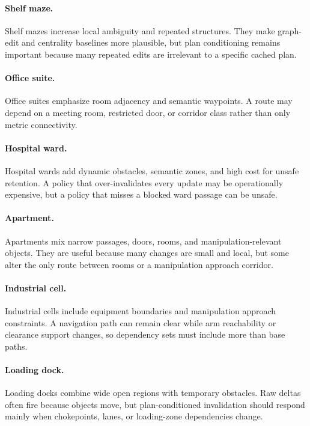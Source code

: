 \documentclass{article}
\begin{document}
\paragraph{Shelf maze.}
Shelf mazes increase local ambiguity and repeated structures. They make graph-edit and centrality baselines more plausible, but plan conditioning remains important because many repeated edits are irrelevant to a specific cached plan.

\paragraph{Office suite.}
Office suites emphasize room adjacency and semantic waypoints. A route may depend on a meeting room, restricted door, or corridor class rather than only metric connectivity.

\paragraph{Hospital ward.}
Hospital wards add dynamic obstacles, semantic zones, and high cost for unsafe retention. A policy that over-invalidates every update may be operationally expensive, but a policy that misses a blocked ward passage can be unsafe.

\paragraph{Apartment.}
Apartments mix narrow passages, doors, rooms, and manipulation-relevant objects. They are useful because many changes are small and local, but some alter the only route between rooms or a manipulation approach corridor.

\paragraph{Industrial cell.}
Industrial cells include equipment boundaries and manipulation approach constraints. A navigation path can remain clear while arm reachability or clearance support changes, so dependency sets must include more than base paths.

\paragraph{Loading dock.}
Loading docks combine wide open regions with temporary obstacles. Raw deltas often fire because objects move, but plan-conditioned invalidation should respond mainly when chokepoints, lanes, or loading-zone dependencies change.
\end{document}

